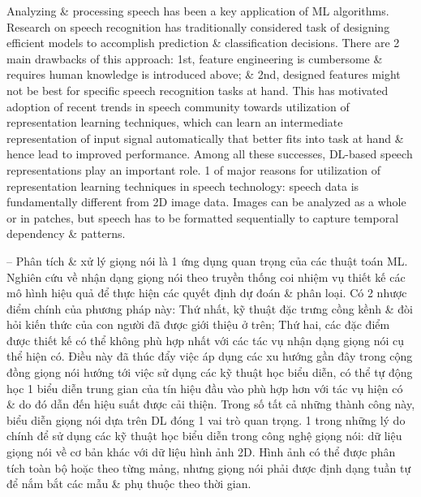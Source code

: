 \documentclass{article}
\begin{document}
\begin{itemize}
\begin{itemize}
\begin{itemize}
            Analyzing \& processing speech has been a key application of ML algorithms. Research on speech recognition has traditionally considered task of designing efficient models to accomplish prediction \& classification decisions. There are 2 main drawbacks of this approach: 1st, feature engineering is cumbersome \& requires human knowledge is introduced above; \& 2nd, designed features might not be best for specific speech recognition tasks at hand. This has motivated adoption of recent trends in speech community towards utilization of representation learning techniques, which can learn an intermediate representation of input signal automatically that better fits into task at hand \& hence lead to improved performance. Among all these successes, DL-based speech representations play an important role. 1 of major reasons for utilization of representation learning techniques in speech technology: speech data is fundamentally different from 2D image data. Images can be analyzed as a whole or in patches, but speech has to be formatted sequentially to capture temporal dependency \& patterns.

            -- Phân tích \& xử lý giọng nói là 1 ứng dụng quan trọng của các thuật toán ML. Nghiên cứu về nhận dạng giọng nói theo truyền thống coi nhiệm vụ thiết kế các mô hình hiệu quả để thực hiện các quyết định dự đoán \& phân loại. Có 2 nhược điểm chính của phương pháp này: Thứ nhất, kỹ thuật đặc trưng cồng kềnh \& đòi hỏi kiến thức của con người đã được giới thiệu ở trên; Thứ hai, các đặc điểm được thiết kế có thể không phù hợp nhất với các tác vụ nhận dạng giọng nói cụ thể hiện có. Điều này đã thúc đẩy việc áp dụng các xu hướng gần đây trong cộng đồng giọng nói hướng tới việc sử dụng các kỹ thuật học biểu diễn, có thể tự động học 1 biểu diễn trung gian của tín hiệu đầu vào phù hợp hơn với tác vụ hiện có \& do đó dẫn đến hiệu suất được cải thiện. Trong số tất cả những thành công này, biểu diễn giọng nói dựa trên DL đóng 1 vai trò quan trọng. 1 trong những lý do chính để sử dụng các kỹ thuật học biểu diễn trong công nghệ giọng nói: dữ liệu giọng nói về cơ bản khác với dữ liệu hình ảnh 2D. Hình ảnh có thể được phân tích toàn bộ hoặc theo từng mảng, nhưng giọng nói phải được định dạng tuần tự để nắm bắt các mẫu \& phụ thuộc theo thời gian.


\end{itemize}
\end{itemize}
\end{itemize}
\end{document}
